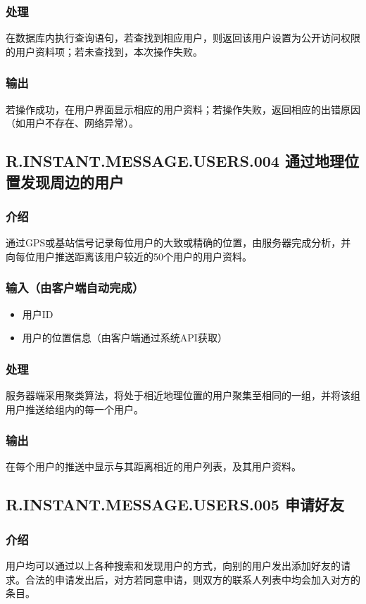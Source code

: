 \subsubsection{处理}
在数据库内执行查询语句，若查找到相应用户，则返回该用户设置为公开访问权限的用户资料项；若未查找到，本次操作失败。
\subsubsection{输出}
若操作成功，在用户界面显示相应的用户资料；若操作失败，返回相应的出错原因（如用户不存在、网络异常）。


\subsection{R.INSTANT.MESSAGE.USERS.004 通过地理位置发现周边的用户}
\subsubsection{介绍}
通过GPS或基站信号记录每位用户的大致或精确的位置，由服务器完成分析，并向每位用户推送距离该用户较近的50个用户的用户资料。
\subsubsection{输入（由客户端自动完成）}
\begin{itemize}
	\item 用户ID
	\item 用户的位置信息（由客户端通过系统API获取）
\end{itemize}
\subsubsection{处理}
服务器端采用聚类算法，将处于相近地理位置的用户聚集至相同的一组，并将该组用户推送给组内的每一个用户。
\subsubsection{输出}
在每个用户的推送中显示与其距离相近的用户列表，及其用户资料。


\subsection{R.INSTANT.MESSAGE.USERS.005 申请好友}
\subsubsection{介绍}
用户均可以通过以上各种搜索和发现用户的方式，向别的用户发出添加好友的请求。合法的申请发出后，对方若同意申请，则双方的联系人列表中均会加入对方的条目。
